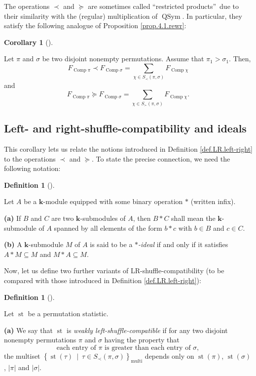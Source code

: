 \documentclass[numbers=enddot,12pt,final,onecolumn,notitlepage]{scrartcl}%
\theoremstyle{definition}
\newtheorem{defi}[theo]{Definition}
\newenvironment{definition}[1][]
{\begin{defi}[#1]\begin{leftbar}}
{\end{leftbar}\end{defi}}
\newtheorem{coro}[theo]{Corollary}
\newenvironment{corollary}[1][]
{\begin{coro}[#1]\begin{leftbar}}
{\end{leftbar}\end{coro}}
\newenvironment{vershort}{}{}
\let\sumnonlimits\sum
\renewcommand{\sum}{\sumnonlimits\limits}
\begin{document}
\begin{vershort}
The operations $\left.  \prec\right.  $ and $\left.  \succeq\right.  $ are
sometimes called \textquotedblleft restricted products\textquotedblright\ due
to their similarity with the (regular) multiplication of $\operatorname*{QSym}%
$. In particular, they satisfy the following analogue of Proposition
\ref{prop.4.1.rewr}:

\begin{corollary}
Let $\pi$ and $\sigma$ be two disjoint nonempty permutations. Assume that
$\pi_{1}>\sigma_{1}$. Then,%
\[
F_{\operatorname*{Comp}\pi}\left.  \prec\right.  F_{\operatorname*{Comp}%
\sigma}=\sum_{\chi\in S_{\prec}\left(  \pi,\sigma\right)  }%
F_{\operatorname*{Comp}\chi}%
\]
and%
\[
F_{\operatorname*{Comp}\pi}\left.  \succeq\right.  F_{\operatorname*{Comp}%
\sigma}=\sum_{\chi\in S_{\succ}\left(  \pi,\sigma\right)  }%
F_{\operatorname*{Comp}\chi}.
\]

\end{corollary}

\subsection{Left- and right-shuffle-compatibility and ideals}

This corollary lets us relate the notions introduced in Definition
\ref{def.LR.left-right} to the operations $\left.  \prec\right.  $ and
$\left.  \succeq\right.  $. To state the precise connection, we need the
following notation:

\begin{definition}
Let $A$ be a $\mathbf{k}$-module equipped with some binary operation $\ast$
(written infix).

\textbf{(a)} If $B$ and $C$ are two $\mathbf{k}$-submodules of $A$, then
$B\ast C$ shall mean the $\mathbf{k}$-submodule of $A$ spanned by all elements
of the form $b\ast c$ with $b\in B$ and $c\in C$.

\textbf{(b)} A $\mathbf{k}$-submodule $M$ of $A$ is said to be a\textit{
}$\ast$\textit{-ideal} if and only if it satisfies $A\ast M\subseteq M$ and
$M\ast A\subseteq M$.
\end{definition}

Now, let us define two further variants of LR-shuffle-compatibility (to be
compared with those introduced in Definition \ref{def.LR.left-right}):

\begin{definition}
Let $\operatorname*{st}$ be a permutation statistic.

\textbf{(a)} We say that $\operatorname*{st}$ is \textit{weakly
left-shuffle-compatible} if for any two disjoint nonempty permutations $\pi$
and $\sigma$ having the property that%
\[
\text{each entry of }\pi\text{ is greater than each entry of }\sigma,
\]
the multiset $\left\{  \operatorname*{st}\left(  \tau\right)  \ \mid\ \tau\in
S_{\prec}\left(  \pi,\sigma\right)  \right\}  _{\operatorname*{multi}}$
depends only on $\operatorname*{st}\left(  \pi\right)  $, $\operatorname*{st}%
\left(  \sigma\right)  $, $\left\vert \pi\right\vert $ and $\left\vert
\sigma\right\vert $.


\end{definition}
\end{vershort}
\end{document}
